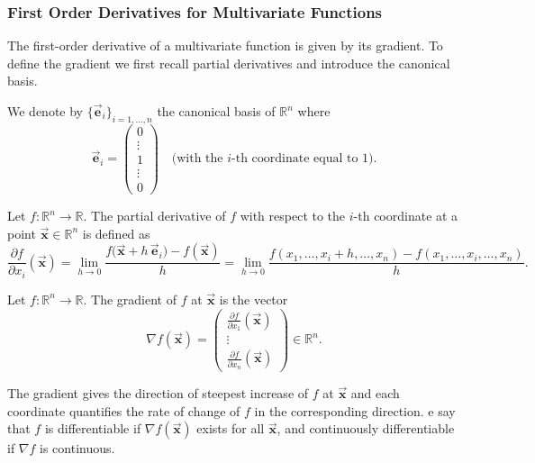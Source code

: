 \documentclass[9pt, headings=standardclasses, parskip=half]{scrartcl}
\renewcommand{\emph}[1]{\textcolor{mypurple}{#1}}
\newcommand{\vect}[1]{\vec{\boldsymbol{#1}}}
\begin{document}


\subsubsection{First Order Derivatives for Multivariate Functions}
The first-order derivative of a multivariate function is given by its \emph{gradient}. To define the gradient we first recall partial derivatives and introduce the canonical basis.

We denote by \(\{\vect{e}_{i}\}_{i=1,\ldots,n}\) the canonical basis of \(\mathbb{R}^{n}\) where
\[
\vect{e}_{i}=\begin{pmatrix}
0\\
\vdots\\
1\\
\vdots\\
0
\end{pmatrix}\quad \text{(with the \(i\)-th coordinate equal to 1)}.
\]

\begin{definition}\label{def:partial_derivative}
Let \(f:\mathbb{R}^{n}\to\mathbb{R}\). The partial derivative of \(f\) with respect to the \(i\)-th coordinate at a point \(\vect{x}\in\mathbb{R}^{n}\) is defined as
\[
\frac{\partial f}{\partial x_{i}}(\vect{x})
=\lim_{h\to0}\frac{f\bigl(\vect{x}+h\,\vect{e}_{i}\bigr)-f(\vect{x})}{h}
=\lim_{h\to0}\frac{f(x_{1},\ldots,x_{i}+h,\ldots,x_{n})-f(x_{1},\ldots,x_{i},\ldots,x_{n})}{h}.
\]
\end{definition}

\begin{definition}[Gradient]\label{def:gradient}
Let \(f:\mathbb{R}^{n}\to\mathbb{R}\). The \emph{gradient} of \(f\) at \(\vect{x}\) is the vector
\[
\nabla f(\vect{x})
=\begin{pmatrix}
\frac{\partial f}{\partial x_{1}}(\vect{x})\\%
\vdots\\%
\frac{\partial f}{\partial x_{n}}(\vect{x})
\end{pmatrix}\in\mathbb{R}^{n}.
\]
\end{definition}
The gradient gives the direction of steepest increase of \(f\) at \(\vect{x}\) and each coordinate quantifies the rate of change of \(f\) in the corresponding direction.
e say that \(f\) is differentiable if \(\nabla f(\vect{x})\) exists for all \(\vect{x}\), and continuously differentiable if \(\nabla f\) is continuous.
\end{document}
